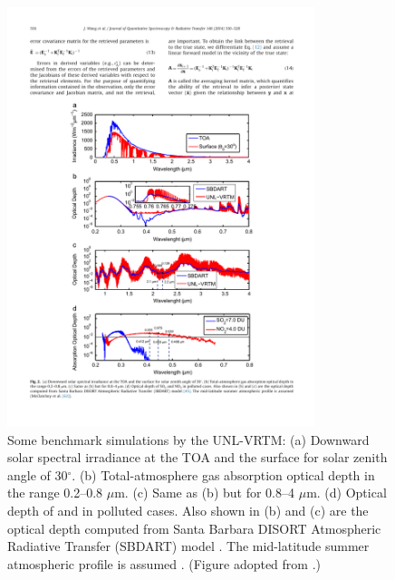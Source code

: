 \begin{figure}[p]
  \centering
  \includegraphics[width={0.8\textwidth}]{figures/unlvrtm1.pdf}
  \caption[Some benchmark simulations by the UNL-VRTM.]
  {Some benchmark simulations by the UNL-VRTM: 
(a) Downward solar spectral irradiance at the TOA and the
surface for solar zenith angle of 30$^\circ$. (b) Total-atmosphere gas
absorption optical depth in the range 0.2--0.8 $\mu$m. (c) Same as (b) but
for 0.8--4 $\mu$m. (d) Optical depth of  and  in
 polluted cases. Also shown in (b) and (c) are the optical depth computed 
from Santa Barbara DISORT Atmospheric Radiative Transfer (SBDART) model
\citep{Ricchiazzi98}. The mid-latitude summer atmospheric profile is 
assumed \citep{McClatchey72}. (Figure adopted from \citet{Wang14}.)}
  \label{fig:unlvrtm1}
\end{figure}

